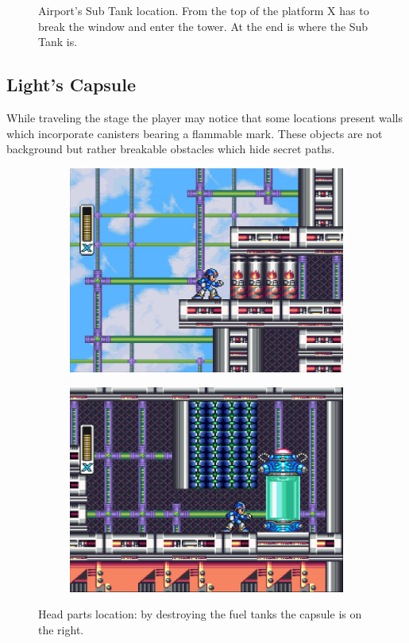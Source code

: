 \begin{figure}[htp]
\begin{subfigure}{0.4\linewidth}
		\caption{}
	\end{subfigure}
	\caption{Airport's Sub Tank location. From the top of the platform X has to break the window and enter the tower. At the end is where the Sub Tank is.}
\end{figure}

\subsection{Light's Capsule} 

While traveling the stage the player may notice that some locations present walls which incorporate canisters bearing a flammable mark. These objects are not background but rather breakable obstacles which hide secret paths. 
\begin{figure}[htp]
	\centering
	\begin{subfigure}{0.4\linewidth}
		\centering
		\includegraphics[width=\linewidth]{figures/X1/Storm_eagle/Storm_armor_1.jpg}
		\caption{}
	\end{subfigure}
	\begin{subfigure}{0.4\linewidth}
		\centering
		\includegraphics[width=\linewidth]{figures/X1/Storm_eagle/Storm_armor_2.jpg}
		\caption{}
	\end{subfigure}
	\caption{Head parts location: by destroying the fuel tanks the capsule is on the right.}
\end{figure}

